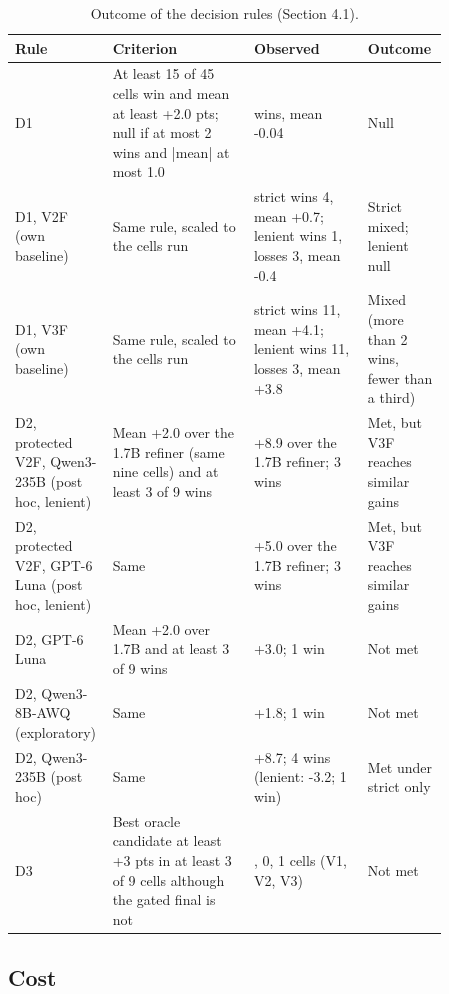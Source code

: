 \documentclass{ieeeaccess}
\begin{document}
\begin{table}[htbp]
\centering
\small
\caption{Outcome of the decision rules (Section 4.1).}
\begin{tabular}{>{\raggedright\arraybackslash}p{0.129\linewidth}>{\raggedright\arraybackslash}p{0.318\linewidth}>{\raggedright\arraybackslash}p{0.258\linewidth}>{\raggedright\arraybackslash}p{0.155\linewidth}}
\toprule
\textbf{Rule} & \textbf{Criterion} & \textbf{Observed} & \textbf{Outcome} \\
\midrule
D1 & At least 15 of 45 cells win and mean at least +2.0 pts; null if at most 2 wins and |mean| at most 1.0 & 0 wins, mean -0.04 & Null \\
D1, V2F (own baseline) & Same rule, scaled to the cells run & strict wins 4, mean +0.7; lenient wins 1, losses 3, mean -0.4 & Strict mixed; lenient null \\
D1, V3F (own baseline) & Same rule, scaled to the cells run & strict wins 11, mean +4.1; lenient wins 11, losses 3, mean +3.8 & Mixed (more than 2 wins, fewer than a third) \\
D2, protected V2F, Qwen3-235B (post hoc, lenient) & Mean +2.0 over the 1.7B refiner (same nine cells) and at least 3 of 9 wins & +8.9 over the 1.7B refiner; 3 wins & Met, but V3F reaches similar gains \\
D2, protected V2F, GPT-6 Luna (post hoc, lenient) & Same & +5.0 over the 1.7B refiner; 3 wins & Met, but V3F reaches similar gains \\
D2, GPT-6 Luna & Mean +2.0 over 1.7B and at least 3 of 9 wins & +3.0; 1 win & Not met \\
D2, Qwen3-8B-AWQ (exploratory) & Same & +1.8; 1 win & Not met \\
D2, Qwen3-235B (post hoc) & Same & +8.7; 4 wins (lenient: -3.2; 1 win) & Met under strict only \\
D3 & Best oracle candidate at least +3 pts in at least 3 of 9 cells although the gated final is not & 0, 0, 1 cells (V1, V2, V3) & Not met \\
\bottomrule
\end{tabular}
\end{table}

\subsection{Cost}
\end{document}
